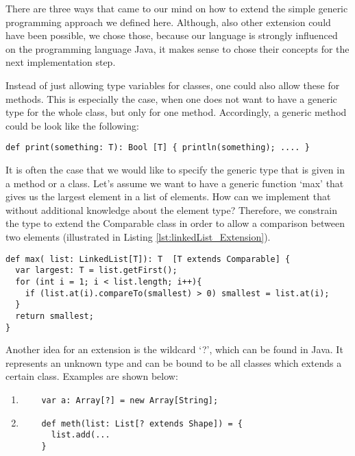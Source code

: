There are three ways that came to our mind on how to extend the simple generic programming approach we defined here. Although, also other extension could have been possible, we chose those, because our language is strongly influenced on the programming language Java, it makes sense to chose their concepts for the next implementation step.

Instead of just allowing type variables for classes, one could also allow these for methods. This is especially the case, when one does not want to have a generic type for the whole class, but only for one method. Accordingly, a generic method could be look like the following:

\begin{lstlisting}
def print(something: T): Bool [T] { println(something); .... }
\end{lstlisting}

It is often the case that we would like to specify the generic type that is given in a method or a class. Let’s assume we want to have a generic function ‘max’ that gives us the largest element in a list of elements. How can we implement that without additional knowledge about the element type? Therefore, we constrain the type to extend the Comparable class in order to allow a comparison between two elements (illustrated in Listing \ref{lst:linkedList_Extension}).

\begin{lstlisting}[caption={Extended LinkedList},label={lst:linkedList_Extension}]
def max( list: LinkedList[T]): T  [T extends Comparable] {
  var largest: T = list.getFirst();
  for (int i = 1; i < list.length; i++){
    if (list.at(i).compareTo(smallest) > 0) smallest = list.at(i);
  }
  return smallest;
}
\end{lstlisting}

Another idea for an extension is the wildcard ‘?’, which can be found in Java. It represents an unknown type and can be bound to be all classes which extends a certain class. Examples are shown below:

\begin{enumerate}
	\item \begin{lstlisting}
	var a: Array[?] = new Array[String];
	\end{lstlisting}
	
	\item \begin{lstlisting}
	def meth(list: List[? extends Shape]) = {
	  list.add(...
	}
	\end{lstlisting}
	
\end{enumerate}